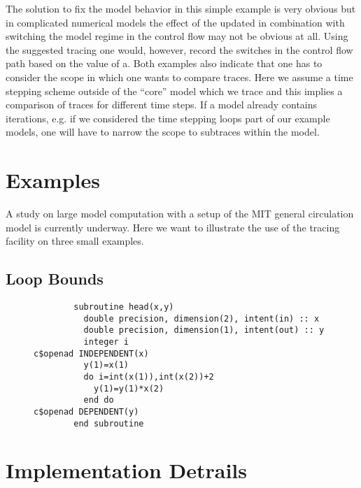 \documentclass{article}
\begin{document}
The solution to fix the model behavior in this simple example is very obvious
but in complicated numerical models the effect of the updated in combination with 
switching the model regime in the control flow may not be obvious at all. 
Using the suggested tracing one would, however, record the switches in 
the control flow path based on the value of a. 
Both examples also indicate that one has to consider the  scope in which 
one wants to compare traces. Here we assume a time stepping scheme 
outside of the ``core'' model which we trace and this implies a comparison 
of traces for different time steps.  
If a model already contains iterations, e.g. if we considered the time stepping 
loops part of our example models, one will have to narrow the scope to 
subtraces within the model. 
 

    


\section{Examples}
A study on large model computation with  a setup of the MIT general circulation model 
is currently underway.  
Here we want to illustrate the use of the tracing facility on three small examples.
\subsection{Loop Bounds}
\begin{figure}
\begin{lstlisting}
        subroutine head(x,y)
          double precision, dimension(2), intent(in) :: x
          double precision, dimension(1), intent(out) :: y
          integer i
c$openad INDEPENDENT(x)
          y(1)=x(1) 
          do i=int(x(1)),int(x(2))+2
            y(1)=y(1)*x(2)
          end do
c$openad DEPENDENT(y)
        end subroutine
\end{lstlisting}
\end{figure} 
 	

\section{Implementation Detrails}\label{sec:implementation}
\end{document}
